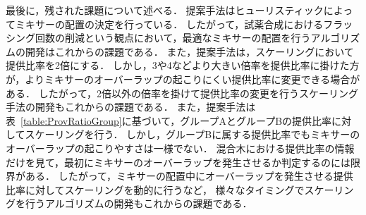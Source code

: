 最後に，残された課題について述べる．
提案手法はヒューリスティックによってミキサーの配置の決定を行っている．
したがって，試薬合成におけるフラッシング回数の削減という観点において，最適なミキサーの配置を行うアルゴリズムの開発はこれからの課題である．
また，提案手法は，スケーリングにおいて提供比率を2倍にする．
しかし，3や4などより大きい倍率を提供比率に掛けた方が，よりミキサーのオーバーラップの起こりにくい提供比率に変更できる場合がある．
したがって，2倍以外の倍率を掛けて提供比率の変更を行うスケーリング手法の開発もこれからの課題である．
また，提案手法は表~\ref{table:ProvRatioGroup}に基づいて，グループAとグループBの提供比率に対してスケーリングを行う．
しかし，グループBに属する提供比率でもミキサーのオーバーラップの起こりやすさは一様でない．
混合木における提供比率の情報だけを見て，最初にミキサーのオーバーラップを発生させるか判定するのには限界がある．
したがって，ミキサーの配置中にオーバーラップを発生させる提供比率に対してスケーリングを動的に行うなど，
様々なタイミングでスケーリングを行うアルゴリズムの開発もこれからの課題である．
%
